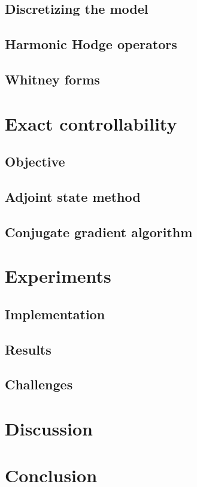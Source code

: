 \documentclass[utf8,english]{gradu3}
\begin{document}
\section{Discretizing the model}


\section{Harmonic Hodge operators}

\section{Whitney forms}



\chapter{Exact controllability}


\section{Objective}

\section{Adjoint state method}

\section{Conjugate gradient algorithm}



\chapter{Experiments}

\section{Implementation}

\section{Results}

\section{Challenges}




\chapter{Discussion}



\chapter{Conclusion}



\printbibliography
\end{document}
